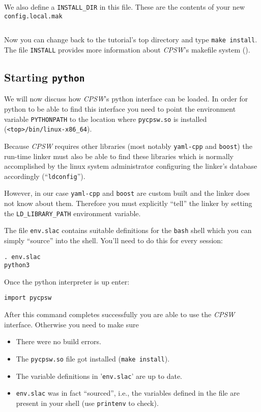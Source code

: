 \documentclass[10pt]{article}
\newcommand{\ita}[1]{\emph{#1}}
\newcommand{\cpsw}      {\ita {CPSW}}
\newcommand{\py}        {python}
\newcommand{\cod}[1] {{\tt#1}}
\begin{document}
We also define a \cod{INSTALL\_DIR} in this file. These are the contents of your new
\cod{config.local.mak}
\begin{verbatim}
\end{verbatim}

Now you can change back to the tutorial's top directory and type \cod{make install}.
The file \cod{INSTALL} provides more information about \cpsw{}'s
makefile system (\cite{INSTALL, makefile}).

\subsection{Starting \cod{\py}}
We will now discuss how \cpsw{}'s \py{} interface can be loaded. In order for
\py{} to be able to find this interface you need to point the environment variable
\cod{PYTHONPATH} to the location where \cod{pycpsw.so} is installed
(\cod{<top>/bin/linux-x86\_64}).

Because \cpsw{} requires other libraries (most notably \cod{yaml-cpp} and \cod{boost})
the run-time linker must also be able to find these libraries which is normally
accomplished by the linux system administrator configuring the linker's database
accordingly (``\cod{ldconfig}'').

However, in our case \cod{yaml-cpp} and \cod{boost} are custom built and the linker
does not know about them. Therefore you must explicitly ``tell'' the linker by setting
the \cod{LD\_LIBRARY\_PATH} environment variable.

The file \cod{env.slac} contains suitable definitions for the \cod{bash} shell which
you can simply ``source'' into the shell. You'll need to do this for every session:

\begin{verbatim}
. env.slac
python3
\end{verbatim}

Once the \py{} interpreter is up enter:

\begin{verbatim}
import pycpsw
\end{verbatim}

After this command completes successfully you are able to use the \cpsw{} interface.
Otherwise you need to make sure
\begin{itemize}
\item There were no build errors.
\item The \cod{pycpsw.so} file got installed (\cod{make install}).
\item The variable definitions in '\cod{env.slac}' are up to date.
\item \cod{env.slac} was in fact ``sourced'', i.e., the variables defined in the
      file are present in your shell (use \cod{printenv} to check).
\end{itemize}
\end{document}
